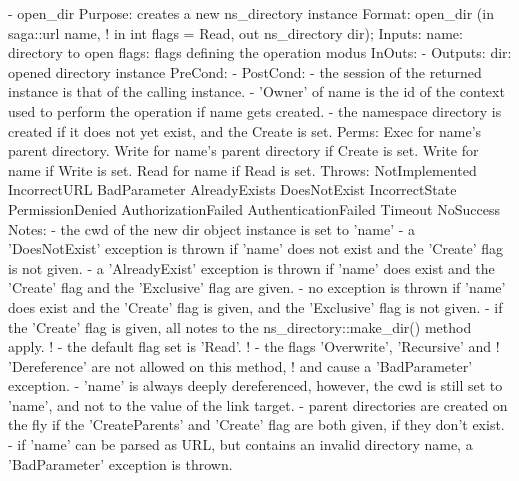 \begin{myspec}
 
    - open_dir
      Purpose:  creates a new ns_directory instance
      Format:   open_dir           (in  saga::url name,
!                                   in  int       flags = Read,
                                    out ns_directory dir);
      Inputs:   name:               directory to open
                flags:              flags defining the operation
                                    modus
      InOuts:   -
      Outputs:  dir:                opened directory instance
      PreCond:  -
      PostCond: - the session of the returned instance is that of
                  the calling instance.
                - 'Owner' of name is the id of the context
                  used to perform the operation if name gets
                  created.
                - the namespace directory is created if it
                  does not yet exist, and the Create is set.
      Perms:    Exec  for name's parent directory.
                Write for name's parent directory if Create is set.
                Write for name if Write is set.
                Read  for name if Read  is set.
      Throws:   NotImplemented
                IncorrectURL
                BadParameter
                AlreadyExists
                DoesNotExist
                IncorrectState
                PermissionDenied
                AuthorizationFailed
                AuthenticationFailed
                Timeout
                NoSuccess
      Notes:    - the cwd of the new dir object instance is set
                  to 'name'
                - a 'DoesNotExist' exception is thrown if 'name'
                  does not exist and the 'Create' flag is not
                  given.
                - a 'AlreadyExist' exception is thrown if 'name'
                  does exist and the 'Create' flag and the
                 'Exclusive' flag are given.
                - no exception is thrown if 'name' does exist and 
                  the 'Create' flag is given, and the 'Exclusive' 
                  flag is not given.
                - if the 'Create' flag is given, all notes to the
                  ns_directory::make_dir() method apply.
!               - the default flag set is 'Read'.
!               - the flags 'Overwrite', 'Recursive' and
!                 'Dereference' are not allowed on this method, 
!                 and cause a 'BadParameter' exception.
                - 'name' is always deeply dereferenced, however,
                  the cwd is still set to 'name', and not to the
                  value of the link target.
                - parent directories are created on the fly if
                  the 'CreateParents' and 'Create' flag are both
                  given, if they don't exist.
                - if 'name' can be parsed as URL, but contains 
                  an invalid directory name, a 'BadParameter'
                  exception is thrown.
 

\end{myspec}
